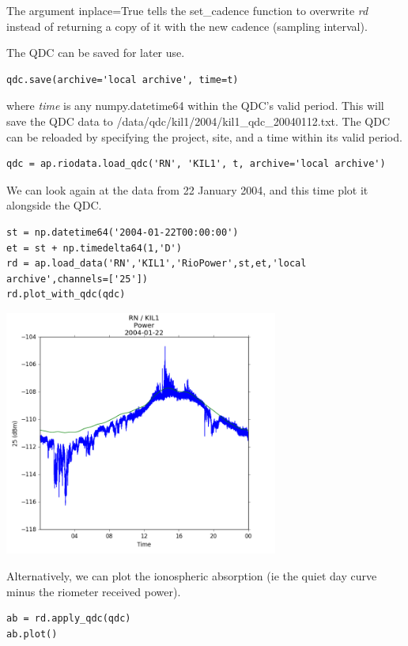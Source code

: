 \documentclass{article}
\begin{document}
\noindent The argument inplace=True tells the set\_cadence function to overwrite {\it rd} instead of returning a copy of it with the new cadence (sampling interval).

The QDC can be saved for later use.

\begin{lstlisting}[style=pythonstyle]
qdc.save(archive='local archive', time=t)
\end{lstlisting}

\noindent where {\it time} is any numpy.datetime64 within the QDC's valid period. This will save the QDC data to /data/qdc/kil1/2004/kil1\_qdc\_20040112.txt.
The QDC can be reloaded by specifying the project, site, and a time within its valid period.
\begin{lstlisting}[style=pythonstyle]
qdc = ap.riodata.load_qdc('RN', 'KIL1', t, archive='local archive')
\end{lstlisting}

We can look again at the data from 22 January 2004, and this time plot it alongside the QDC.

\begin{lstlisting}[style=pythonstyle]
st = np.datetime64('2004-01-22T00:00:00')
et = st + np.timedelta64(1,'D')
rd = ap.load_data('RN','KIL1','RioPower',st,et,'local archive',channels=['25'])
rd.plot_with_qdc(qdc)
\end{lstlisting}

\includegraphics[width=9cm]{images/figure_4.png}


\noindent Alternatively, we can plot the ionospheric absorption (ie the quiet day curve minus the riometer received power).
\begin{lstlisting}[style=pythonstyle]
ab = rd.apply_qdc(qdc)
ab.plot()
\end{lstlisting}
\end{document}
